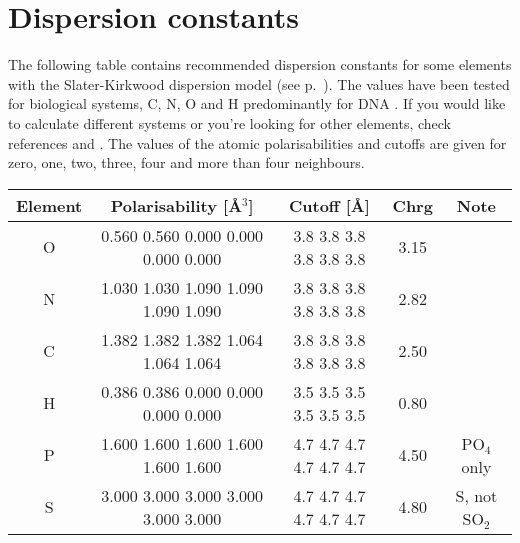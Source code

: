 \chapter{Dispersion constants}
\label{app:dispconsts}

The following table contains recommended dispersion constants for some elements
with the Slater-Kirkwood dispersion model (see
p.~). The values have been tested for biological
systems, C, N, O and H predominantly for DNA \cite{elstner-jcp-114-5149}. If you
would like to calculate different systems or you're looking for other elements,
check references \cite{miller-JAmChemSoc-112-8533} and
\cite{kang-TheorChimActa-61-41}. The values of the atomic polarisabilities and
cutoffs are given for zero, one, two, three, four and more than four neighbours.

\begin{center}
\begin{tabular}{|c|c|c|c|c|} \hline
Element & Polarisability [\AA$^3$] & Cutoff [\AA] & Chrg & Note \\
\hline
O & 0.560 0.560 0.000 0.000 0.000 0.000 & 3.8 3.8 3.8 3.8 3.8 3.8 &
3.15 & \\
N & 1.030 1.030 1.090 1.090 1.090 1.090 & 3.8 3.8 3.8 3.8 3.8 3.8 &
2.82 & \\
C & 1.382 1.382 1.382 1.064 1.064 1.064 & 3.8 3.8 3.8 3.8 3.8 3.8 &
2.50 & \\
H & 0.386 0.386 0.000 0.000 0.000 0.000 & 3.5 3.5 3.5 3.5 3.5 3.5 &
0.80 & \\
P & 1.600 1.600 1.600 1.600 1.600 1.600 & 4.7 4.7 4.7 4.7 4.7 4.7 &
4.50 & PO$_4$ only \\
S & 3.000 3.000 3.000 3.000 3.000 3.000 & 4.7 4.7 4.7 4.7 4.7 4.7 &
4.80 & S, not SO$_2$ \\
\hline
\end{tabular}
\end{center}

